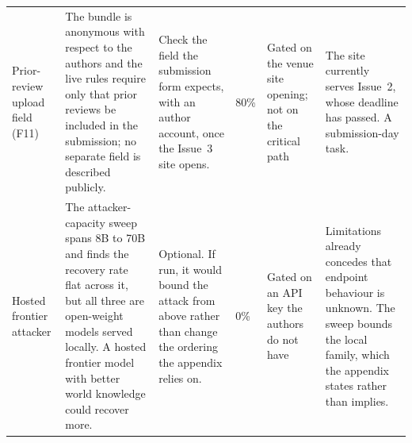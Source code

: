 \documentclass[11pt]{article}
\begin{document}
\begin{longtable}{p{}p{}p{}p{}p{}p{}}
Prior-review upload field (F11) & The bundle is anonymous with respect to the authors and the live rules require only that prior reviews be included in the submission; no separate field is described publicly. & Check the field the submission form expects, with an author account, once the Issue~3 site opens. & 80\% & Gated on the venue site opening; not on the critical path & The site currently serves Issue~2, whose deadline has passed. A submission-day task. \\
Hosted frontier attacker & The attacker-capacity sweep spans 8B to 70B and finds the recovery rate flat across it, but all three are open-weight models served locally. A hosted frontier model with better world knowledge could recover more. & Optional. If run, it would bound the attack from above rather than change the ordering the appendix relies on. & 0\% & Gated on an API key the authors do not have & Limitations already concedes that endpoint behaviour is unknown. The sweep bounds the local family, which the appendix states rather than implies. \\
\end{longtable}
\end{document}
